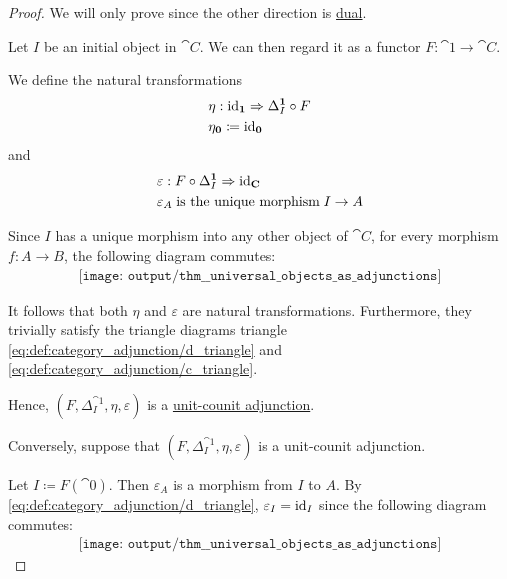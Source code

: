 \begin{proof}
  We will only prove  since the other direction is \hyperref[thm:categorical_principle_of_duality]{dual}.

  \SufficiencySubProof Let \( I \) be an initial object in \( \cat{C} \). We can then regard it as a functor \( F: \cat{1} \to \cat{C} \).

  We define the natural transformations
  \begin{equation*}
    \begin{aligned}
      &\eta: \id_{\cat{1}} \Rightarrow \Delta_I^{\cat{1}} \bincirc F \\
      &\eta_{\cat{0}} \coloneqq \id_{\cat{0}}
    \end{aligned}
  \end{equation*}
  and
  \begin{equation*}
    \begin{aligned}
      &\varepsilon: F \bincirc \Delta_I^{\cat{1}} \Rightarrow \id_{\cat{C}} \\
      &\varepsilon_A \T{is the unique morphism} I \to A
    \end{aligned}
  \end{equation*}

  Since \( I \) has a unique morphism into any other object of \( \cat{C} \), for every morphism \( f: A \to B \), the following diagram commutes:
  \begin{equation}\label{eq:thm:universal_objects_as_adjunctions/sufficiency_nat}
    \begin{aligned}
      \texttt{[image: output/thm\_\_universal\_objects\_as\_adjunctions]}
    \end{aligned}
  \end{equation}

  It follows that both \( \eta \) and \( \varepsilon \) are natural transformations. Furthermore, they trivially satisfy the triangle diagrams triangle \eqref{eq:def:category_adjunction/d_triangle} and \eqref{eq:def:category_adjunction/c_triangle}.

  Hence, \( (F, \Delta_I^{\cat{1}}, \eta, \varepsilon) \) is a \hyperref[def:category_adjunction/unit_counit]{unit-counit adjunction}.

  \NecessitySubProof Conversely, suppose that \( (F, \Delta_I^{\cat{1}}, \eta, \varepsilon) \) is a unit-counit adjunction.

  Let \( I \coloneqq F(\cat{0}) \). Then \( \varepsilon_A \) is a morphism from \( I \) to \( A \). By \eqref{eq:def:category_adjunction/d_triangle}, \( \varepsilon_I = \operatorname{id}_I \) since the following diagram commutes:
  \begin{equation}\label{eq:thm:universal_objects_as_adjunctions/d_triangle}
    \begin{aligned}
      \texttt{[image: output/thm\_\_universal\_objects\_as\_adjunctions]}
    \end{aligned}
  \end{equation}


\end{proof}
